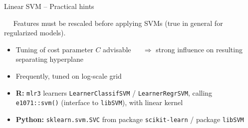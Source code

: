 
\begin{frame}{Linear SVM -- Practical hints}

\footnotesize

 ~~
Features must be rescaled before applying SVMs (true in general for regularized 
models).

\medskip


\begin{itemize}
  \item Tuning of cost parameter $C$ advisable ~~ $\Rightarrow$ strong influence 
  on resulting separating hyperplane
  \item Frequently, tuned on log-scale grid
\end{itemize}

\medskip

\begin{itemize}
  \item \textbf{R:} \texttt{mlr3} learners \texttt{LearnerClassifSVM} /
  \texttt{LearnerRegrSVM}, calling \texttt{e1071::svm()} (interface to 
  \texttt{libSVM}), with linear kernel
  \item \textbf{Python:} \texttt{sklearn.svm.SVC} from package 
  \texttt{scikit-learn} / package \texttt{libSVM}
\end{itemize}

\end{frame}
